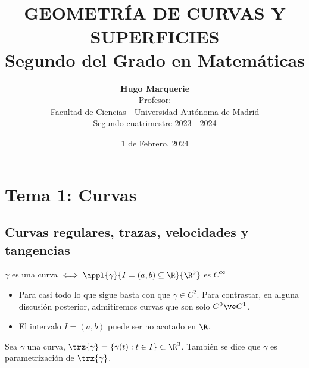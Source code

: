 \documentclass[12pt]{article}
\title{ \normalsize
		\HRule{0.06cm} \\ [0.5cm] %
		\LARGE \textbf{\uppercase{Geometría de curvas y superficies}
		\HRule{0.06cm} \\ \LARGE{Segundo del Grado en Matemáticas} \vfill}}
\date{1 de Febrero, 2024}
\author{\textbf{Hugo Marquerie} \\ 
		Profesor: \\
		Facultad de Ciencias - Universidad Autónoma de Madrid \\
		Segundo cuatrimestre 2023 - 2024}
\begin{document}
\onehalfspacing
\setlength{\abovedisplayskip}{0.15cm}
\setlength{\belowdisplayskip}{0.25cm}

\maketitle
\thispagestyle{empty}
\clearpage
{} 

\section{Tema 1: Curvas}

\subsection{Curvas regulares, trazas, velocidades y tangencias}
\begin{defn}[Curva]
	$\gamma$ es una curva $\iff \appl{\gamma}{I=(a,b)\subseteq\R}{\R^3}$ es $C^{\infty}$
	\begin{itemize}
		\item Para casi todo lo que sigue basta con que $\gamma \in C^2$. Para contrastar, en alguna discusión posterior, admitiremos curvas que son solo $C^0 \ve C^1$.
		\item El intervalo $I = (a,b)$ puede ser no acotado en $\R$.
	\end{itemize}
\end{defn}
\begin{defn}[Traza]
	Sea $\gamma$ una curva, $\trz{\gamma}=\{\gamma(t):t\in I\}\subset \R^3$. También se dice que $\gamma$ es parametrización de $\trz{\gamma}$.
\end{defn}
\end{document}

